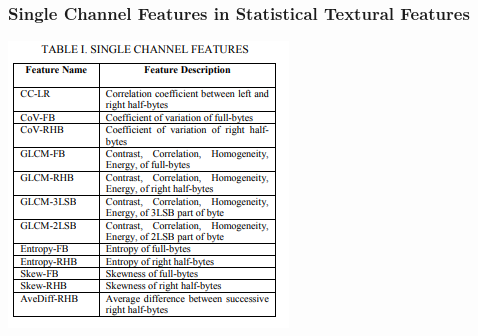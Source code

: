 \documentclass{beamer} %
\theoremstyle{definition} %
\begin{document}
\begin{frame}
\frametitle{Single Channel Features in Statistical Textural Features  }
\includegraphics[scale=1.0]{singleChannelFeatures.png}
\end{frame}
\end{document}
